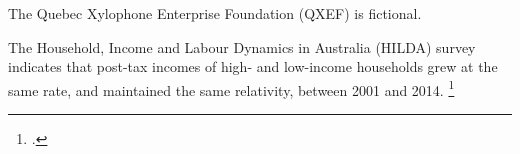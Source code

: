 \documentclass{grattan}
\begin{document}
The Quebec Xylophone Enterprise Foundation (QXEF) is fictional.

The Household, Income and Labour Dynamics in Australia (HILDA) survey indicates that post-tax incomes of high- and low-income households grew at the same rate, and maintained the same relativity, between 2001 and 2014.%
    \footcite{Wilkins2016HouseholdIncomeLabour}
\end{document}
